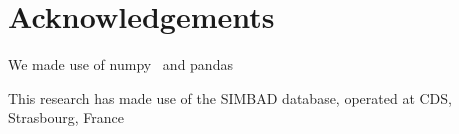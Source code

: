 \documentclass[fleqn,usenatbib,letters]{mnras}%
\begin{document}
\section*{Acknowledgements}
We made use of numpy~\citep{numpy2020} and pandas~\citep{pandas2010,pandas2020software}

This research has made use of the SIMBAD database, operated at CDS, Strasbourg, France~\citep{wenger2000}












%
%




\bsp	%
\label{lastpage}
\end{document}
